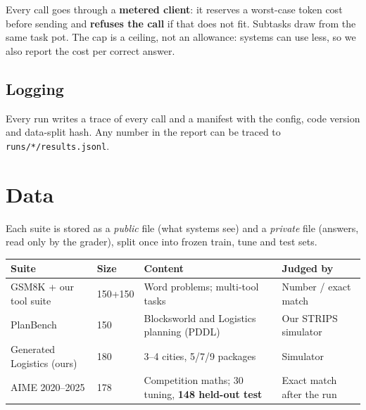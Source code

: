 \documentclass[11pt,a4paper]{article}
\begin{document}
Every call goes through a \textbf{metered client}: it reserves a worst-case token cost before sending and
\textbf{refuses the call} if that does not fit. Subtasks draw from the same task pot. The cap is a
ceiling, not an allowance: systems can use less, so we also report the cost per correct answer.

\subsection{Logging}
Every run writes a trace of every call and a manifest with the config, code version and data-split hash.
Any number in the report can be traced to \texttt{runs/*/results.jsonl}.

\section{Data}
Each suite is stored as a \emph{public} file (what systems see) and a \emph{private} file (answers, read
only by the grader), split once into frozen train, tune and test sets.

\begin{tabularx}{\linewidth}{@{}p{3.6cm}p{1.3cm}Lp{3.0cm}@{}}
\toprule
\textbf{Suite} & \textbf{Size} & \textbf{Content} & \textbf{Judged by} \\
\midrule
GSM8K + our tool suite & 150+150 & Word problems; multi-tool tasks & Number / exact match \\
PlanBench & 150 & Blocksworld and Logistics planning (PDDL) & Our STRIPS simulator \\
Generated Logistics (ours) & 180 & 3--4 cities, 5/7/9 packages & Simulator \\
AIME 2020--2025 & 178 & Competition maths; 30 tuning, \textbf{148 held-out test} & Exact match after the run \\
\bottomrule
\end{tabularx}
\end{document}
